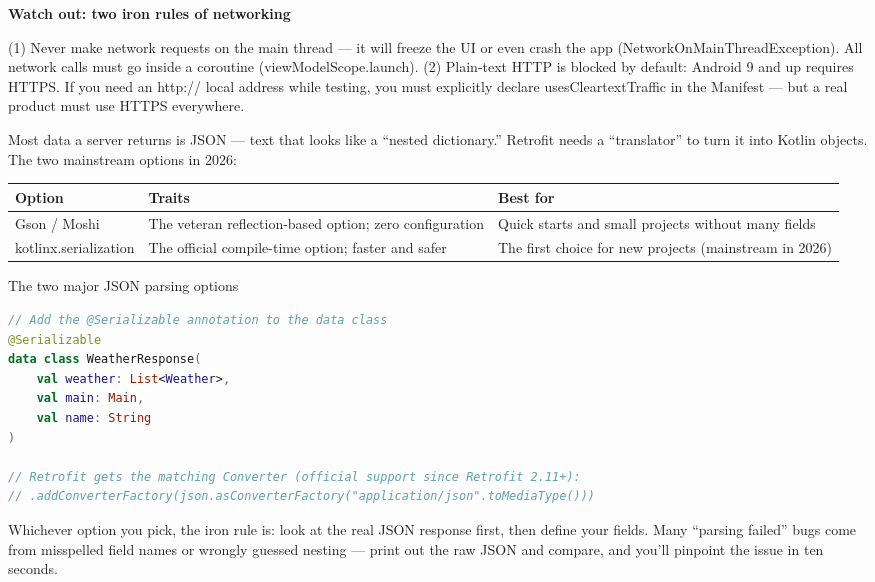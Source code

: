 \textbf{Watch out: two iron rules of networking}\par

(1) Never make network requests on the main thread — it will freeze the UI or even crash the app (NetworkOnMainThreadException). All network calls must go inside a coroutine (viewModelScope.launch). (2) Plain-text HTTP is blocked by default: Android 9 and up requires HTTPS. If you need an http:// local address while testing, you must explicitly declare usesCleartextTraffic in the Manifest — but a real product must use HTTPS everywhere.


Most data a server returns is JSON — text that looks like a “nested dictionary.” Retrofit needs a “translator” to turn it into Kotlin objects. The two mainstream options in 2026:

\begin{center}
\begin{tabularx}{\linewidth}{|X|X|X|}
\hline
\textbf{Option} & \textbf{Traits} & \textbf{Best for} \tabularnewline
\hline
Gson / Moshi & The veteran reflection-based option; zero configuration & Quick starts and small projects without many fields \tabularnewline
kotlinx.serialization & The official compile-time option; faster and safer & The first choice for new projects (mainstream in 2026) \tabularnewline
\hline
\end{tabularx}
\end{center}

\begin{center}\small\color{gray}The two major JSON parsing options\end{center}

\begin{lstlisting}[language=Kotlin]
// Add the @Serializable annotation to the data class
@Serializable
data class WeatherResponse(
    val weather: List<Weather>,
    val main: Main,
    val name: String
)

// Retrofit gets the matching Converter (official support since Retrofit 2.11+):
// .addConverterFactory(json.asConverterFactory("application/json".toMediaType()))
\end{lstlisting}

Whichever option you pick, the iron rule is: look at the real JSON response first, then define your fields. Many “parsing failed” bugs come from misspelled field names or wrongly guessed nesting — print out the raw JSON and compare, and you'll pinpoint the issue in ten seconds.

